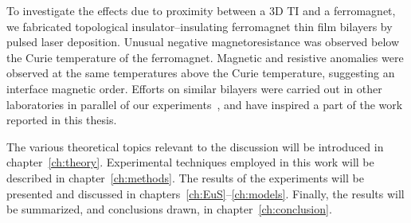 To investigate the effects due to proximity between a 3D TI and a ferromagnet, we fabricated topological insulator--insulating ferromagnet thin film bilayers by pulsed laser deposition. Unusual negative magnetoresistance was observed below the Curie temperature of the ferromagnet. Magnetic and resistive anomalies were observed at the same temperatures above the Curie temperature, suggesting an interface magnetic order. Efforts on similar bilayers were carried out in other laboratories in parallel of our experiments~\cite{Moodera2013, Samarth2013, Moodera2016}, and have inspired a part of the work reported in this thesis.

The various theoretical topics relevant to the discussion will be introduced in chapter~\ref{ch:theory}. Experimental techniques employed in this work will be described in chapter~\ref{ch:methods}. The results of the experiments will be presented and discussed in chapters~\ref{ch:EuS}--\ref{ch:models}. Finally, the results will be summarized, and conclusions drawn, in chapter~\ref{ch:conclusion}.
